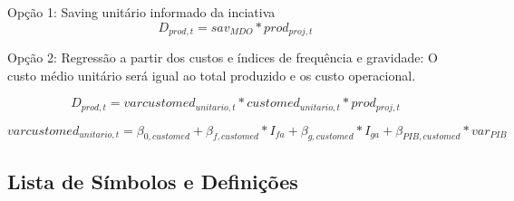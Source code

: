 \documentclass[]{article}
\begin{document}
Opção 1: Saving unitário informado da inciativa
\[D_{prod,t} = sav_{MDO} * prod_{proj,t}\]

Opção 2: Regressão a partir dos custos e índices de frequência e
gravidade: O custo médio unitário será igual ao total produzido e os
custo operacional.

\[D_{prod,t} = varcustomed_{unitario,t} * customed_{unitario,t} * prod_{proj,t}\]

\[varcustomed_{unitario,t} = \beta_{0,customed} +\beta_{f,customed} * I_{fa} + \beta_{g,customed} * I_{ga} + \beta_{PIB,customed} * var_{PIB}\]

\subsection{Lista de Símbolos e
Definições}\label{lista-de-simbolos-e-definicoes}
\end{document}
